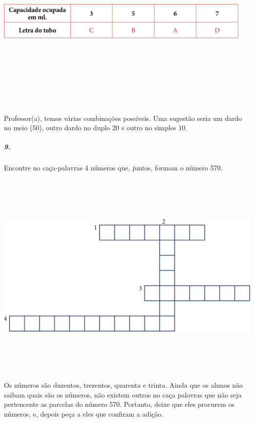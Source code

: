 \includegraphics[width=5.00000in,height=3.54167in]{media/image37.png}

Professor(a), temos várias combinações possíveis. Uma sugestão seria um
dardo no meio (50), outro dardo no duplo 20 e outro no simples 10.

\subparagraph{9.}\label{section-22}

Encontre no caça-palavras 4 números que, juntos, formam o número
570.

\includegraphics[width=6.04167in,height=4.07813in]{media/image38.png}

Os números são duzentos, trezentos, quarenta e trinta. Ainda que os
alunos não saibam quais são os números, não existem outros no caça
palavras que não seja pertencente as parcelas do número 570. Portanto,
deixe que eles procurem os números, e, depois peça a eles que confiram a
adição.

